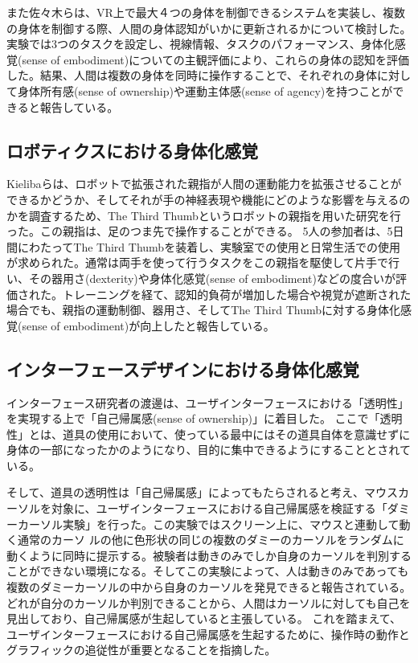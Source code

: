 また佐々木ら\cite{sasaki2022multisoma}は、VR上で最大４つの身体を制御できるシステムを実装し、複数の身体を制御する際、人間の身体認知がいかに更新されるかについて検討した。実験では3つのタスクを設定し、視線情報、タスクのパフォーマンス、身体化感覚(sense of embodiment)についての主観評価により、これらの身体の認知を評価した。結果、人間は複数の身体を同時に操作することで、それぞれの身体に対して身体所有感(sense of ownership)や運動主体感(sense of agency)を持つことができると報告している。

\subsection{ロボティクスにおける身体化感覚}

Kielibaら\cite{kieliba2021robotic}は、ロボットで拡張された親指が人間の運動能力を拡張させることができるかどうか、そしてそれが手の神経表現や機能にどのような影響を与えるのかを調査するため、The Third Thumbというロボットの親指を用いた研究を行った。この親指は、足のつま先で操作することができる。
5人の参加者は、5日間にわたってThe Third Thumbを装着し、実験室での使用と日常生活での使用が求められた。通常は両手を使って行うタスクをこの親指を駆使して片手で行い、その器用さ(dexterity)や身体化感覚(sense of embodiment)などの度合いが評価された。トレーニングを経て、認知的負荷が増加した場合や視覚が遮断された場合でも、親指の運動制御、器用さ、そしてThe Third Thumbに対する身体化感覚(sense of embodiment)が向上したと報告している。

\subsection{インターフェースデザインにおける身体化感覚}
インターフェース研究者の渡邊は、ユーザインターフェースにおける「透明性」を実現する上で「自己帰属感(sense of ownership)」に着目した\cite{Watanabe2017}。
ここで「透明性」とは、道具の使用において、使っている最中にはその道具自体を意識せずに身体の一部になったかのようになり、目的に集中できるようにすることとされている。

そして、道具の透明性は「自己帰属感」によってもたらされると考え、マウスカーソルを対象に、ユーザインターフェースにおける自己帰属感を検証する「ダミーカーソル実験」を行った\cite{Watanabe2013}。この実験ではスクリーン上に、マウスと連動して動く通常のカーソ
ルの他に色形状の同じの複数のダミーのカーソルをランダムに動くように同時に提示する。被験者は動きのみでしか自身のカーソルを判別することができない環境になる。そしてこの実験によって、人は動きのみであっても複数のダミーカーソルの中から自身のカーソルを発見できると報告されている。どれが自分のカーソルか判別できることから、人間はカーソルに対しても自己を見出しており、自己帰属感が生起していると主張している。
これを踏まえて、ユーザインターフェースにおける自己帰属感を生起するために、操作時の動作とグラフィックの追従性が重要となることを指摘した。

